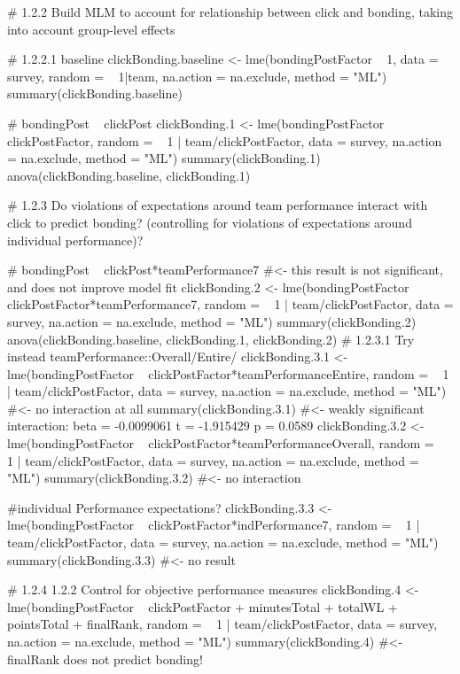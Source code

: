 #     1.2.2 Build MLM to account for relationship between click and bonding, taking into account group-level effects


#       1.2.2.1 baseline
clickBonding.baseline <- lme(bondingPostFactor ~ 1, data = survey, random = ~ 1|team,  na.action = na.exclude, method = "ML")
summary(clickBonding.baseline)

#     bondingPost ~ clickPost
clickBonding.1 <- lme(bondingPostFactor ~ clickPostFactor, random = ~ 1 | team/clickPostFactor,
                              data = survey, na.action = na.exclude, method = "ML")
summary(clickBonding.1)
anova(clickBonding.baseline, clickBonding.1)

#       1.2.3 Do violations of expectations around team performance interact with click to predict bonding? (controlling for violations of expectations around individual performance)?

# bondingPost ~ clickPost*teamPerformance7  #<- this result is not significant, and does not improve model fit
clickBonding.2 <- lme(bondingPostFactor ~ clickPostFactor*teamPerformance7, random = ~ 1 | team/clickPostFactor,
                              data = survey, na.action = na.exclude, method = "ML")
summary(clickBonding.2)
anova(clickBonding.baseline, clickBonding.1, clickBonding.2)
#               1.2.3.1 Try instead teamPerformance::Overall/Entire/
clickBonding.3.1 <- lme(bondingPostFactor ~ clickPostFactor*teamPerformanceEntire, random = ~ 1 | team/clickPostFactor,
                                data = survey, na.action = na.exclude, method = "ML")  #<- no interaction at all
summary(clickBonding.3.1)  #<- weakly significant interaction: beta = -0.0099061 t =  -1.915429  p = 0.0589
clickBonding.3.2 <- lme(bondingPostFactor ~ clickPostFactor*teamPerformanceOverall, random = ~ 1 | team/clickPostFactor,
                                data = survey, na.action = na.exclude, method = "ML")
summary(clickBonding.3.2)  #<- no interaction

#individual Performance expectations?
clickBonding.3.3 <- lme(bondingPostFactor ~ clickPostFactor*indPerformance7, random = ~ 1 | team/clickPostFactor,
                      data = survey, na.action = na.exclude, method = "ML")
summary(clickBonding.3.3)  #<- no result


#       1.2.4      1.2.2 Control for objective performance measures
clickBonding.4 <- lme(bondingPostFactor ~ clickPostFactor + minutesTotal + totalWL + pointsTotal + finalRank,
                              random = ~ 1 | team/clickPostFactor, data = survey, na.action = na.exclude, method = "ML")
summary(clickBonding.4)  #<- finalRank does not predict bonding!















